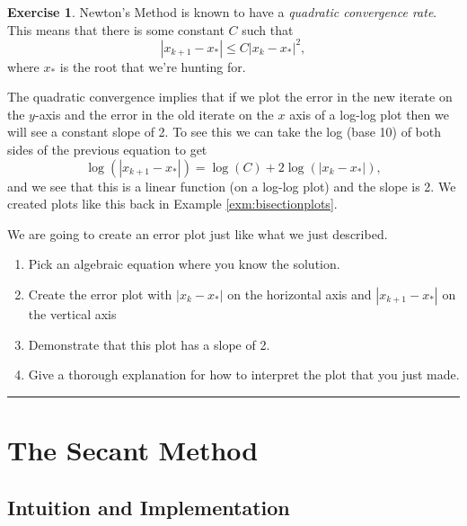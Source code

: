 \documentclass[
]{book}
\providecommand{\tightlist}{%
  \setlength{\itemsep}{0pt}\setlength{\parskip}{0pt}}
\theoremstyle{definition}
\theoremstyle{definition}
\theoremstyle{definition}
\newtheorem{exercise}{Exercise}[chapter]
\theoremstyle{remark}
\begin{document}
\begin{exercise}
\protect\hypertarget{exr:unnamed-chunk-111}{}{\label{exr:unnamed-chunk-111} }Newton's Method is known to have a
\emph{quadratic convergence rate}. This means that there is some constant \(C\)
such that \[|x_{k+1} - x_*| \leq C |x_{k} - x_*|^2,\] where \(x_*\) is the
root that we're hunting for.

The quadratic convergence implies that if we plot the error in the new iterate on the \(y\)-axis and
the error in the old iterate on the \(x\) axis of a log-log plot then we
will see a constant slope of 2. To see this we can take the log (base
10) of both sides of the previous equation to get
\[\log(|x_{k+1} - x_*|) = \log(C) + 2 \log(|x_{k} - x_*|),\]
and we see that this is a linear function (on a log-log plot) and the slope is 2. We created plots like this back in Example \ref{exm:bisectionplots}.

We are going to create an error plot just like what we just described.

\begin{enumerate}
\def\labelenumi{\alph{enumi}.}
\tightlist
\item
  Pick an algebraic equation where you know the solution.\\
\item
  Create the error plot with \(|x_{k} - x_*|\) on the horizontal axis and \(|x_{k+1} - x_*|\) on the vertical axis
\item
  Demonstrate that this plot has a slope of 2.
\item
  Give a thorough explanation for how to interpret the plot that you just made.
\end{enumerate}
\end{exercise}

\begin{center}\rule{0.5\linewidth}{0.5pt}\end{center}

\hypertarget{the-secant-method}{%
\section{The Secant Method}\label{the-secant-method}}

\hypertarget{intuition-and-implementation-3}{%
\subsection{Intuition and Implementation}\label{intuition-and-implementation-3}}
\end{document}
